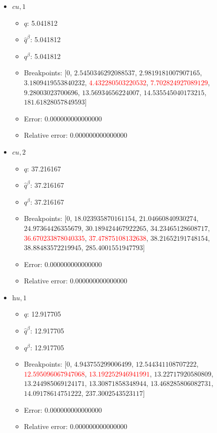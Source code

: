 \documentclass{article}%
\begin{document}
\begin{itemize}
%
	\item $\textit{cu},1$%
	\begin{itemize}%
		\item $q$: 5.041812%
		\item $\hat{q}^\beta$: 5.041812%
		\item $q^\beta$: 5.041812%
		\item Breakpoints: $[$$0$, $2.5450346292088537$, $2.9819181007907165$, $3.1809419553840232$, \textcolor{red}{$4.432280503220532$}, \textcolor{red}{$7.702824927089129$}, $9.28003023700696$, $13.56934656224007$, $14.535545040173215$, $181.61828057849593$$]$%
		\item Error: 0.000000000000000%
		\item Relative error: 0.000000000000000%
	\end{itemize}%
	\item $\textit{cu},2$%
	\begin{itemize}%
		\item $q$: 37.216167%
		\item $\hat{q}^\beta$: 37.216167%
		\item $q^\beta$: 37.216167%
		\item Breakpoints: $[$$0$, $18.023935870161154$, $21.04660840930274$, $24.97364426355679$, $30.189424467922265$, $34.23465128608717$, \textcolor{red}{$36.670233878040335$}, \textcolor{red}{$37.47875108132638$}, $38.21652191748154$, $38.88483572219945$, $285.4001551947793$$]$%
		\item Error: 0.000000000000000%
		\item Relative error: 0.000000000000000%
	\end{itemize}%
	\item $\textit{hu},1$%
	\begin{itemize}%
		\item $q$: 12.917705%
		\item $\hat{q}^\beta$: 12.917705%
		\item $q^\beta$: 12.917705%
		\item Breakpoints: $[$$0$, $4.943755299006499$, $12.544341108707222$, \textcolor{red}{$12.595096067947068$}, \textcolor{red}{$13.192252946941991$}, $13.22717920580809$, $13.244985069124171$, $13.30871858348944$, $13.468285806082731$, $14.09178614751222$, $237.3002543523117$$]$%
		\item Error: 0.000000000000000%
		\item Relative error: 0.000000000000000%
	\end{itemize}%
\end{itemize}%
\end{document}
